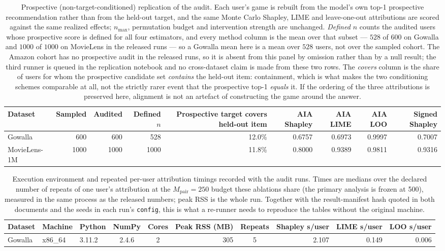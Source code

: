 \begin{table}[!htbp]\centering\scriptsize\setlength{\tabcolsep}{3pt}
\caption{Prospective (non-target-conditioned) replication of the audit. Each user's game is rebuilt from the model's own top-1 prospective recommendation rather than from the held-out target, and the same Monte Carlo Shapley, LIME and leave-one-out attributions are scored against the same realized effects; $n_{\max}$, permutation budget and intervention strength are unchanged. \emph{Defined $n$} counts the audited users whose prospective score is defined for all four estimators, and every method column is the mean over that subset --- $528$ of $600$ on Gowalla and $1000$ of $1000$ on MovieLens in the released runs --- so a Gowalla mean here is a mean over $528$ users, not over the sampled cohort. The Amazon cohort has no prospective audit in the released runs, so it is absent from this panel by omission rather than by a null result; the third runner is queued in the replication notebook and no cross-dataset claim is made from these two rows. The \emph{covers} column is the share of users for whom the prospective candidate set \emph{contains} the held-out item: containment, which is what makes the two conditioning schemes comparable at all, not the strictly rarer event that the prospective top-1 \emph{equals} it. If the ordering of the three attributions is preserved here, alignment is not an artefact of constructing the game around the answer.}
\label{tab:r9-prospective-replication}
\begin{tabular}{@{}lrrrrrrrr@{}}
\toprule
Dataset & Sampled & Audited & Defined $n$ & Prospective target covers held-out item & AIA Shapley & AIA LIME & AIA LOO & Signed Shapley \\
\midrule
Gowalla & 600 & 600 & 528 & 12.0\% & 0.6757 & 0.6973 & 0.9997 & 0.7007 \\
MovieLens-1M & 1000 & 1000 & 1000 & 11.8\% & 0.8000 & 0.9389 & 0.9811 & 0.9316 \\
\bottomrule
\end{tabular}
\end{table}


\begin{table}[!htbp]\centering\scriptsize\setlength{\tabcolsep}{3pt}
\caption{Execution environment and repeated per-user attribution timings recorded with the audit runs. Times are medians over the declared number of repeats of one user's attribution at the $M_{\mathrm{pair}}=250$ budget these ablations share (the primary analysis is frozen at 500), measured in the same process as the released numbers; peak RSS is the whole run. Together with the result-manifest hash quoted in both documents and the seeds in each run's \texttt{config}, this is what a re-runner needs to reproduce the tables without the original machine.}
\label{tab:r9-hardware}
\begin{tabular}{@{}lllccrcrrr@{}}
\toprule
Dataset & Machine & Python & NumPy & Cores & Peak RSS (MB) & Repeats & Shapley s/user & LIME s/user & LOO s/user \\
\midrule
Gowalla & x86_64 & 3.11.2 & 2.4.6 & 2 & 305 & 5 & 2.107 & 0.149 & 0.006 \\
\bottomrule
\end{tabular}
\end{table}

